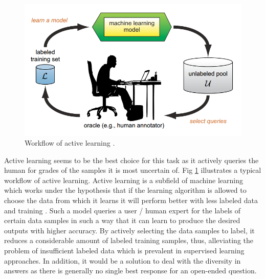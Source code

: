 \documentclass[rnd]{mas_proposal}
\begin{document}
\begin{figure}[h!]
    \includegraphics[width=\textwidth]{images/active_learning}
    \caption{Workflow of active learning \cite{Settles2010}.}
    \label{ac_workflow}
\end{figure}

Active learning seems to be the best choice for this task as it actively queries the human for grades of the samples it is most uncertain of. Fig \ref{ac_workflow} illustrates a typical workflow of active learning. Active learning is a subfield of machine learning which works under the hypothesis that if the learning algorithm is allowed to choose the data from which it learns it will perform better with less labeled data and training \cite{Settles2010}. Such a model queries a user / human expert for the labels of certain data samples in such a way that it can learn to produce the desired outputs with higher accuracy. By actively selecting the data samples to label, it reduces a considerable amount of labeled training samples, thus, alleviating the problem of insufficient labeled data which is prevalent in supervised learning approaches. In addition, it would be a solution to deal with the diversity in answers as there is generally no single best response for an open-ended question.   

\newpage
\end{document}
